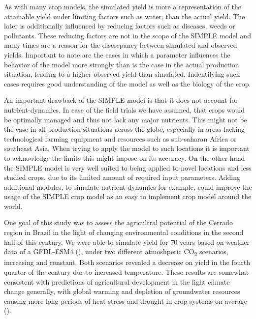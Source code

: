 \documentclass[11pt]{article}
\begin{document}
As with many crop models, the simulated yield is more a representation of the attainable yield under limiting factors such as water, than the actual yield. The later is additionally influenced by reducing factors such as diseases, weeds or pollutants. These reducing factors are not in the scope of the SIMPLE model and many times are a reason for the discrepancy between simulated and observed yields. Important to note are the cases in which a parameter influences the behavior of the model more strongly than is the case in the actual production situation, leading to a higher observed yield than simulated. Indentifying such cases requires good understanding of the model as well as the biology of the crop.

An important drawback of the SIMPLE model is that it does not account for nutrient-dynamics. In case of the field trials we have assumed, that crops would be optimally managed and thus not lack any major nutrients. This might not be the case in all production-situations across the globe, especially in areas lacking technological farming equipment and resources such as sub-saharan Africa or southeast Asia. When trying to apply the model to such locations it is important to acknowledge the limits this might impose on its accuracy. On the other hand the SIMPLE model is very well suited to being applied to novel locations and less studied crops, due to its limited amount of required input parameters. Adding additional modules, to simulate nutrient-dynamics for example, could improve the usage of the SIMPLE crop model as an easy to implement crop model around the world.

One goal of this study was to assess the agricultral potential of the Cerrado region in Brazil in the light of changing environmental conditions in the second half of this century. We were able to simulate yield for 70 years based on weather data of a GFDL-ESM4 (\cite{dunne-2020-gfdl-earth}), under two different atmoshperic CO\textsubscript{2} scenarios, increasing and constant. Both scenarios revealed a decrease on yield in the fourth quarter of the century due to increased temperature. These results are somewhat consistent with predictions of agricultural development in the light climate change generally, with global warming and depletion of groundwater resources causing more long periods of heat stress and drought in crop systems on average (\cite{poertner-2022-climat-chang}).
\end{document}

